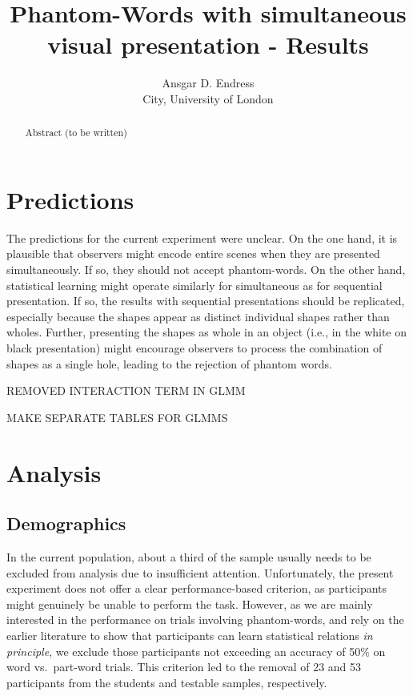 \documentclass[
]{article}
\title{Phantom-Words with simultaneous visual presentation - Results}
\author{Ansgar D. Endress\\
City, University of London}
\date{}
\begin{document}
\maketitle
\begin{abstract}
Abstract (to be written)
\end{abstract}

\hypertarget{predictions}{%
\section{Predictions}\label{predictions}}

The predictions for the current experiment were unclear. On the one
hand, it is plausible that observers might encode entire scenes when
they are presented simultaneously. If so, they should not accept
phantom-words. On the other hand, statistical learning might operate
similarly for simultaneous as for sequential presentation. If so, the
results with sequential presentations should be replicated, especially
because the shapes appear as distinct individual shapes rather than
wholes. Further, presenting the shapes as whole in an object (i.e., in
the white on black presentation) might encourage observers to process
the combination of shapes as a single hole, leading to the rejection of
phantom words.

REMOVED INTERACTION TERM IN GLMM

MAKE SEPARATE TABLES FOR GLMMS

\hypertarget{analysis}{%
\section{Analysis}\label{analysis}}

\hypertarget{demographics}{%
\subsection{Demographics}\label{demographics}}

In the current population, about a third of the sample usually needs to
be excluded from analysis due to insufficient attention. Unfortunately,
the present experiment does not offer a clear performance-based
criterion, as participants might genuinely be unable to perform the
task. However, as we are mainly interested in the performance on trials
involving phantom-words, and rely on the earlier literature to show that
participants can learn statistical relations \emph{in principle}, we
exclude those participants not exceeding an accuracy of 50\% on word
vs.~part-word trials. This criterion led to the removal of 23 and 53
participants from the students and testable samples, respectively.
\end{document}
